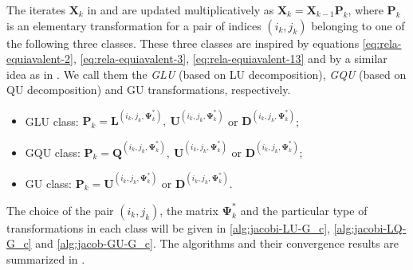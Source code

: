 \documentclass[final,onefignum,onetabnum]{siamart190516}
\newcounter{example}
\newcommand{\matr}[1]{\boldsymbol{#1}}
\newcommand{\Gmat}[3]{\matr{Q}^{(#1,#2,#3)}}
\newcommand{\Utwo}{\Psi}
\newcommand{\Lmat}[3]{\matr{L}^{(#1,#2,#3)}}
\newcommand{\Umat}[3]{\matr{U}^{(#1,#2,#3)}}
\newcommand{\Dmat}[3]{\matr{D}^{(#1,#2,#3)}}
\begin{document}
The iterates $\matr{X}_k$ in  and  are updated multiplicatively as $\matr{X}_k = \matr{X}_{k-1}\matr{P}_{k}$, where $\matr{P}_{k}$ is an elementary transformation for a pair of indices $(i_k,j_k)$ belonging to one of the following three classes. 
These three classes are inspired by equations \cref{eq:rela-equiavalent-2}, \cref{eq:rela-equiavalent-3}, \cref{eq:rela-equiavalent-13} and by a similar idea as in \cite{IshtAV13:simax,LUC2017globally,ULC2019}.
We call them the \emph{GLU} (based on LU decomposition), \emph{GQU} (based on QU decomposition) and GU transformations, respectively. 
\begin{itemize}
\item {GLU class}:  $\matr{P}_{k}=\Lmat{i_k}{j_k}{\matr{\Utwo}^{*}_{k}},\ \Umat{i_k}{j_k}{\matr{\Utwo}^{*}_{k}}$ or $\Dmat{i_k}{j_k}{\matr{\Utwo}^{*}_{k}}$;
\item GQU class:  $\matr{P}_{k}=\Gmat{i_k}{j_k}{\matr{\Utwo}^{*}_{k}},\ \Umat{i_k}{j_k}{\matr{\Utwo}^{*}_{k}}$ or $\Dmat{i_k}{j_k}{\matr{\Utwo}^{*}_{k}}$;
\item GU class:  $\matr{P}_{k}= \Umat{i_k}{j_k}{\matr{\Utwo}^{*}_{k}}$ or $\Dmat{i_k}{j_k}{\matr{\Utwo}^{*}_{k}}$.
\end{itemize}
The choice of the pair $(i_k,j_k)$, the matrix $\matr{\Utwo}^{*}_{k}$ and the particular type of transformations in each class will be given in  \autoref{alg:jacobi-LU-G_c}, \autoref{alg:jacobi-LQ-G_c} and \autoref{alg:jacob-GU-G_c}.
The algorithms and their convergence results are summarized in  . 
\end{document}
